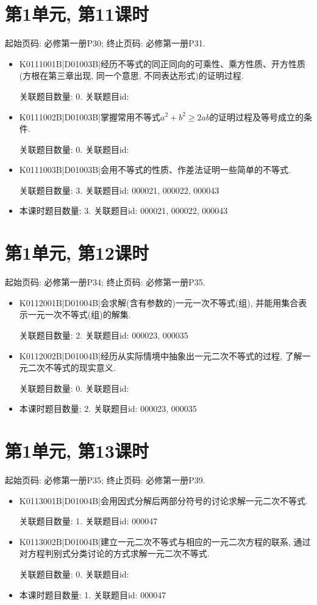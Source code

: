 \section*{第1单元, 第11课时}
起始页码: 必修第一册P30; 终止页码: 必修第一册P31.
\begin{itemize}
\item K0111001B|D01003B|经历不等式的同正同向的可乘性、乘方性质、开方性质(方根在第三章出现, 同一个意思, 不同表达形式)的证明过程.

关联题目数量: 0. 关联题目id: 

\item K0111002B|D01003B|掌握常用不等式$a^2+b^2 \ge 2ab$的证明过程及等号成立的条件.

关联题目数量: 0. 关联题目id: 

\item K0111003B|D01003B|会用不等式的性质、作差法证明一些简单的不等式.

关联题目数量: 3. 关联题目id: 000021, 000022, 000043

\item 本课时题目数量: 3. 关联题目id: 000021, 000022, 000043

\end{itemize}

\section*{第1单元, 第12课时}
起始页码: 必修第一册P34; 终止页码: 必修第一册P35.
\begin{itemize}
\item K0112001B|D01004B|会求解(含有参数的)一元一次不等式(组), 并能用集合表示一元一次不等式(组)的解集.

关联题目数量: 2. 关联题目id: 000023, 000035

\item K0112002B|D01004B|经历从实际情境中抽象出一元二次不等式的过程, 了解一元二次不等式的现实意义.

关联题目数量: 0. 关联题目id: 

\item 本课时题目数量: 2. 关联题目id: 000023, 000035

\end{itemize}

\section*{第1单元, 第13课时}
起始页码: 必修第一册P35; 终止页码: 必修第一册P39.
\begin{itemize}
\item K0113001B|D01004B|会用因式分解后两部分符号的讨论求解一元二次不等式.

关联题目数量: 1. 关联题目id: 000047

\item K0113002B|D01004B|建立一元二次不等式与相应的一元二次方程的联系, 通过对方程判别式分类讨论的方式求解一元二次不等式.

关联题目数量: 0. 关联题目id: 

\item 本课时题目数量: 1. 关联题目id: 000047

\end{itemize}

